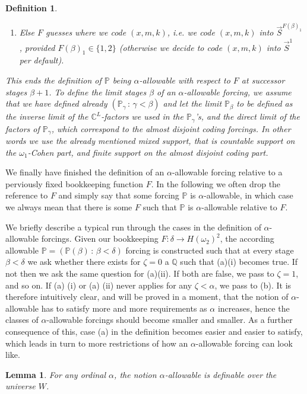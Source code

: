 \documentclass[a4paper,11pt]{article}
\newtheorem{lemma}[theorem]{Lemma}
\newtheorem{definition}[theorem]{Definition}
\newcommand{\forceP}{\mathbb{P}}
\newcommand{\forceQ}{\mathbb{Q}}
\begin{document}
\begin{definition}
\begin{enumerate}
\item[(b)] Else $F$ guesses where we  code $(x,m,k)$, i.e. we code $(x,m,k)$ into $\vec{S}^{F(\beta)_1}$, provided  $F(\beta)_1 \in \{1,2\}$ (otherwise we decide to code $(x,m,k)$ into $\vec{S}^1$ per default).
\end{enumerate}

This ends the definition of $\forceP$ being $\alpha$-allowable with respect to $F$ at successor stages $\beta+1$. To define the limit stages $\beta$ of an $\alpha$-allowable forcing,
we assume that we have defined already
$(\forceP_{\gamma} \, : \, \gamma < \beta)$ and let the limit
$\forceP_{\beta}$ to be defined as the inverse limit of the $\mathbb{C}^L$-factors we used in the $\forceP_{\gamma}$'s, and the direct limit of the 
factors of $\forceP_{\gamma}$, which correspond to the almost disjoint coding forcings. In other words we use the already mentioned mixed support, that is countable support on the $\omega_1$-Cohen part, and finite support on the almost disjoint coding part.
\end{definition}

We finally have finished the definition of an $\alpha$-allowable forcing relative to a perviously fixed bookkeeping function $F$. In the following  we often drop the reference to $F$ and simply say that some forcing $\forceP$ is $\alpha$-allowable, in which case we always mean that there is some $F$ such that $\forceP$ is $\alpha$-allowable relative to $F$.
 
We briefly describe a typical run through the cases in the definition of $\alpha$-allowable forcings. Given our bookkeeping $F: \delta \rightarrow H(\omega_2)^2$, the according allowable $\forceP= (\forceP(\beta) \, : \, \beta < \delta)$ forcing is constructed such that at every stage $\beta< \delta$  we ask whether there exists for $\zeta=0$ a $\forceQ$ such that (a)(i) becomes true. If not then we ask the same question for (a)(ii). If both are false, we pass to $\zeta=1$, and so on. If (a) (i) or (a) (ii) never applies for any $\zeta < \alpha$, we pass to (b). It is therefore intuitively clear, and will be proved in a moment, that the notion of $\alpha$-allowable has to satisfy more and more requirements as $\alpha$ increases, hence the classes of $\alpha$-allowable forcings should become smaller and smaller. As a further consequence of this, case (a) in the definition becomes easier and easier to satisfy, which leads in turn to more restrictions of how an $\alpha$-allowable forcing can look like.


\begin{lemma}
For any ordinal $\alpha$, the notion $\alpha$-allowable is definable over the universe $W$. 
\end{lemma}
\end{document}
